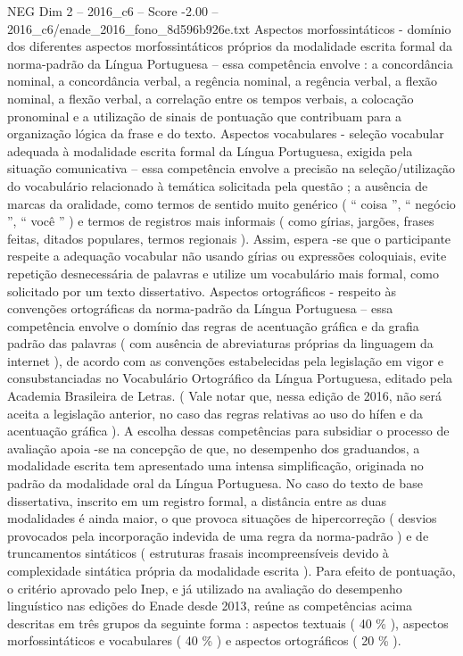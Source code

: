 \begin{textsample}{NEG Dim 2 – 2016\_c6 – Score -2.00 – 2016\_c6/enade\_2016\_fono\_8d596b926e.txt}
Aspectos morfossintáticos - domínio dos diferentes aspectos morfossintáticos próprios da modalidade escrita formal da norma-padrão da Língua Portuguesa – essa competência envolve : a concordância nominal, a concordância verbal, a regência nominal, a regência verbal, a flexão nominal, a flexão verbal, a correlação entre os tempos verbais, a colocação pronominal e a utilização de sinais de pontuação que contribuam para a organização lógica da frase e do texto.
Aspectos vocabulares - seleção vocabular adequada à modalidade escrita formal da Língua Portuguesa, exigida pela situação comunicativa – essa competência envolve a precisão na seleção/utilização do vocabulário relacionado à temática solicitada pela questão ; a ausência de marcas da oralidade, como termos de sentido muito genérico ( “ coisa ”, “ negócio ”, “ você ” ) e termos de registros mais informais ( como gírias, jargões, frases feitas, ditados populares, termos regionais ).
Assim, espera -se que o participante respeite a adequação vocabular não usando gírias ou expressões coloquiais, evite repetição desnecessária de palavras e utilize um vocabulário mais formal, como solicitado por um texto dissertativo.
Aspectos ortográficos - respeito às convenções ortográficas da norma-padrão da Língua Portuguesa – essa competência envolve o domínio das regras de acentuação gráfica e da grafia padrão das palavras ( com ausência de abreviaturas próprias da linguagem da internet ), de acordo com as convenções estabelecidas pela legislação em vigor e consubstanciadas no Vocabulário Ortográfico da Língua Portuguesa, editado pela Academia Brasileira de Letras. ( Vale notar que, nessa edição de 2016, não será aceita a legislação anterior, no caso das regras relativas ao uso do hífen e da acentuação gráfica ).
A escolha dessas competências para subsidiar o processo de avaliação apoia -se na concepção de que, no desempenho dos graduandos, a modalidade escrita tem apresentado uma intensa simplificação, originada no padrão da modalidade oral da Língua Portuguesa.
No caso do texto de base dissertativa, inscrito em um registro formal, a distância entre as duas modalidades é ainda maior, o que provoca situações de hipercorreção ( desvios provocados pela incorporação indevida de uma regra da norma-padrão ) e de truncamentos sintáticos ( estruturas frasais incompreensíveis devido à complexidade sintática própria da modalidade escrita ).
Para efeito de pontuação, o critério aprovado pelo Inep, e já utilizado na avaliação do desempenho linguístico nas edições do Enade desde 2013, reúne as competências acima descritas em três grupos da seguinte forma : aspectos textuais ( 40 \% ), aspectos morfossintáticos e vocabulares ( 40 \% ) e aspectos ortográficos ( 20 \% ).

\end{textsample}
